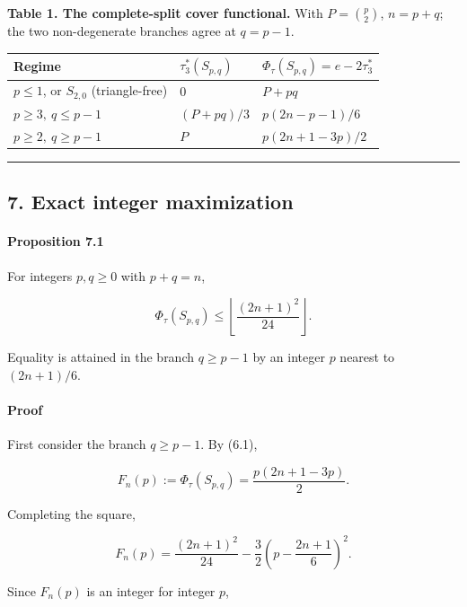 \documentclass[
  american,
  11pt,
  a4paper,
]{article}
\newcounter{none} %
\begin{document}
\textbf{Table 1. The complete-split cover functional.} With \(P=\binom p2\), \(n=p+q\); the two non-degenerate branches agree at \(q=p-1\).

{\def\LTcaptype{none} %
\begin{longtable}[]{@{}lll@{}}
\toprule\noalign{}
Regime & \(\tau_3^*(S_{p,q})\) & \(\Phi_\tau(S_{p,q})=e-2\tau_3^*\) \\
\midrule\noalign{}
\endhead
\bottomrule\noalign{}
\endlastfoot
\(p\le1\), or \(S_{2,0}\) (triangle-free) & \(0\) & \(P+pq\) \\
\(p\ge3,\ q\le p-1\) & \((P+pq)/3\) & \(p(2n-p-1)/6\) \\
\(p\ge2,\ q\ge p-1\) & \(P\) & \(p(2n+1-3p)/2\) \\
\end{longtable}
}

\begin{center}\rule{0.5\linewidth}{0.5pt}\end{center}

\subsection{7. Exact integer maximization}\label{exact-integer-maximization}

\paragraph{Proposition 7.1}\label{proposition-7.1}

For integers \(p,q\ge0\) with \(p+q=n\),

\[
\Phi_\tau(S_{p,q})
\le
\left\lfloor\frac{(2n+1)^2}{24}\right\rfloor.
\]

Equality is attained in the branch \(q\ge p-1\) by an integer \(p\) nearest to \((2n+1)/6\).

\paragraph{Proof}\label{proof-11}

First consider the branch \(q\ge p-1\). By (6.1),

\[
F_n(p)
:=
\Phi_\tau(S_{p,q})
=
\frac{p(2n+1-3p)}2.
\]

Completing the square,

\[
F_n(p)
=
\frac{(2n+1)^2}{24}
-
\frac32
\left(
p-\frac{2n+1}{6}
\right)^2.
\tag{7.1}
\]

Since \(F_n(p)\) is an integer for integer \(p\),
\end{document}
